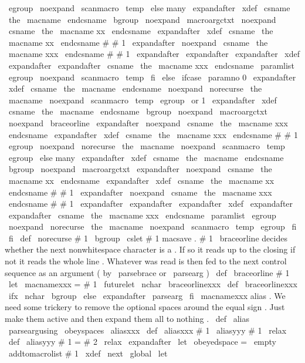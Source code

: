 {{{{
%
\
egroup
\
noexpand
\
scanmacro
{
\
temp
}
}
%
\
else
%
many
\
expandafter
\
xdef
\
csname
\
the
\
macname
\
endcsname
{
%
\
bgroup
\
noexpand
\
macroargctxt
\
noexpand
\
csname
\
the
\
macname
xx
\
endcsname
}
%
\
expandafter
\
xdef
\
csname
\
the
\
macname
xx
\
endcsname
#
#
1
{
%
\
expandafter
\
noexpand
\
csname
\
the
\
macname
xxx
\
endcsname
#
#
1
}
%
\
expandafter
\
expandafter
\
expandafter
\
xdef
\
expandafter
\
expandafter
\
csname
\
the
\
macname
xxx
\
endcsname
\
paramlist
{
\
egroup
\
noexpand
\
scanmacro
{
\
temp
}
}
%
\
fi
\
else
\
ifcase
\
paramno
%
0
\
expandafter
\
xdef
\
csname
\
the
\
macname
\
endcsname
{
%
\
noexpand
\
norecurse
{
\
the
\
macname
}
%
\
noexpand
\
scanmacro
{
\
temp
}
\
egroup
}
%
\
or
%
1
\
expandafter
\
xdef
\
csname
\
the
\
macname
\
endcsname
{
%
\
bgroup
\
noexpand
\
macroargctxt
\
noexpand
\
braceorline
\
expandafter
\
noexpand
\
csname
\
the
\
macname
xxx
\
endcsname
}
%
\
expandafter
\
xdef
\
csname
\
the
\
macname
xxx
\
endcsname
#
#
1
{
%
\
egroup
\
noexpand
\
norecurse
{
\
the
\
macname
}
%
\
noexpand
\
scanmacro
{
\
temp
}
\
egroup
}
%
\
else
%
many
\
expandafter
\
xdef
\
csname
\
the
\
macname
\
endcsname
{
%
\
bgroup
\
noexpand
\
macroargctxt
\
expandafter
\
noexpand
\
csname
\
the
\
macname
xx
\
endcsname
}
%
\
expandafter
\
xdef
\
csname
\
the
\
macname
xx
\
endcsname
#
#
1
{
%
\
expandafter
\
noexpand
\
csname
\
the
\
macname
xxx
\
endcsname
#
#
1
}
%
\
expandafter
\
expandafter
\
expandafter
\
xdef
\
expandafter
\
expandafter
\
csname
\
the
\
macname
xxx
\
endcsname
\
paramlist
{
%
\
egroup
\
noexpand
\
norecurse
{
\
the
\
macname
}
%
\
noexpand
\
scanmacro
{
\
temp
}
\
egroup
}
%
\
fi
\
fi
}
\
def
\
norecurse
#
1
{
\
bgroup
\
cslet
{
#
1
}
{
macsave
.
#
1
}
}
%
\
braceorline
decides
whether
the
next
nonwhitespace
character
is
a
%
{
.
If
so
it
reads
up
to
the
closing
}
if
not
it
reads
the
whole
%
line
.
Whatever
was
read
is
then
fed
to
the
next
control
sequence
%
as
an
argument
(
by
\
parsebrace
or
\
parsearg
)
\
def
\
braceorline
#
1
{
\
let
\
macnamexxx
=
#
1
\
futurelet
\
nchar
\
braceorlinexxx
}
\
def
\
braceorlinexxx
{
%
\
ifx
\
nchar
\
bgroup
\
else
\
expandafter
\
parsearg
\
fi
\
macnamexxx
}
%
alias
.
%
We
need
some
trickery
to
remove
the
optional
spaces
around
the
equal
%
sign
.
Just
make
them
active
and
then
expand
them
all
to
nothing
.
\
def
\
alias
{
\
parseargusing
\
obeyspaces
\
aliasxxx
}
\
def
\
aliasxxx
#
1
{
\
aliasyyy
#
1
\
relax
}
\
def
\
aliasyyy
#
1
=
#
2
\
relax
{
%
{
%
\
expandafter
\
let
\
obeyedspace
=
\
empty
\
addtomacrolist
{
#
1
}
%
\
xdef
\
next
{
\
global
\
let
\
}}}}}
